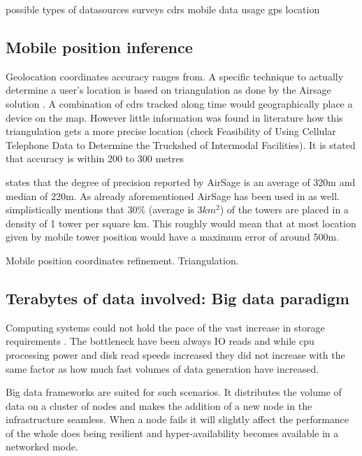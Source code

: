 \documentclass[12pt, a4paper]{report}
\theoremstyle{definition}
\theoremstyle{definition}%
\theoremstyle{definition}%
\theoremstyle{definition}%
\theoremstyle{definition}%
\theoremstyle{definition}%
\begin{document}
possible types of datasources
surveys
cdrs
mobile data usage
gps location



\subsection{Mobile position inference} \label{background_mobile_position_inference} 

Geolocation coordinates accuracy ranges from. A specific technique to actually determine a user's location is based on triangulation as done by the Airsage solution \cite{Hoteit2014}. A combination of cdrs tracked along time would geographically place a device on the map. However little information was found in literature how this triangulation gets a more precise location (check Feasibility of Using Cellular Telephone Data to Determine the Truckshed of Intermodal Facilities).  It is stated that accuracy is within 200 to 300 metres \cite{Colak2015}

\cite{Calabrese2013} states that the degree of precision reported by AirSage is an average of 320m and median of 220m. As already aforementioned AirSage has been used in \cite{Hoteit2014} as well. \cite{Gonzalez2008} simplistically mentions that 30\% (average is \(3km^{2}\)) of the towers are placed in a density of 1 tower per square km. This roughly would mean that at most location given by mobile tower position would have a maximum error of around 500m. 

Mobile position coordinates refinement. Triangulation.




\subsection{Terabytes of data involved: Big data paradigm} \label{background_big_data}

Computing systems could not hold the pace of  the vast increase in storage requirements \cite{Liu2014}. The bottleneck have been always IO reads and while cpu processing power and disk read speeds increased they did not increase with the same factor as how much fast volumes of data generation have increased.

Big data frameworks are suited for such scenarios. It distributes the volume of data on a cluster of nodes and makes the addition of a new node in the infrastructure seamless. When a node fails it will slightly affect the performance of the whole does being resilient and hyper-availability becomes available in a networked mode.
\end{document}
